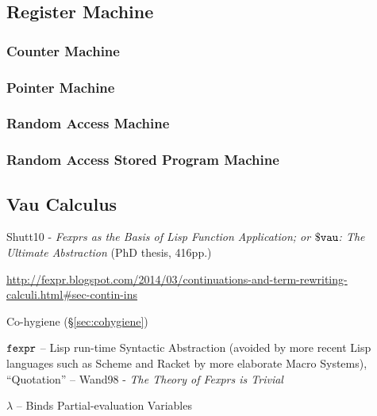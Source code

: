 \subsection{Register Machine}\label{sec:register_machine}

\subsubsection{Counter Machine}

\subsubsection{Pointer Machine}

\subsubsection{Random Access Machine}

\subsubsection{Random Access Stored Program Machine}



\subsection{Vau Calculus}\label{sec:vau_calculus}


Shutt10 - \emph{Fexprs as the Basis of Lisp Function Application; or
  $\mathtt{\$vau}$: The Ultimate Abstraction} (PhD thesis, 416pp.)

\url{http://fexpr.blogspot.com/2014/03/continuations-and-term-rewriting-calculi.html#sec-contin-ins}

Co-hygiene (\S\ref{sec:cohygiene})

$\mathtt{fexpr}$ -- Lisp run-time Syntactic Abstraction (avoided by more
recent Lisp languages such as Scheme and Racket by more elaborate
Macro Systems), ``Quotation'' -- Wand98 - \emph{The Theory of Fexprs is Trivial}

$\lambda$ -- Binds Partial-evaluation Variables

